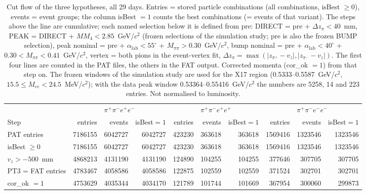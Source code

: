 \begin{table}[H]
\centering\scriptsize
\setlength{\tabcolsep}{3pt}
\caption{Cut flow of the three hypotheses, all 29 days. Entries = stored particle combinations (all combinations, isBest $\geq 0$), events = event groups; the column isBest $=1$ counts the best combinations (= events of that variant). The steps above the line are cumulative; each named selection below it is defined from pre: DIRECT = pre + $\Delta z_\pi<40$~mm, PEAK = DIRECT + $MM_4<2.85$~GeV/$c^2$ (frozen selections of the simulation study; pre is also the frozen BUMP selection), peak nominal = pre + $\alpha_\mathrm{lab}<55^\circ$ + $M_{\pi\pi}>0.30$~GeV/$c^2$, bump nominal = pre + $\alpha_\mathrm{lab}<40^\circ$ + $0.30<M_{\pi\pi}<0.41$~GeV/$c^2$, vertex = both pions in the event-vertex fit, $\Delta z_\pi=\max(|z_{\pi^+}-v_z|,|z_{\pi^-}-v_z|)$. The first four lines are counted in the PAT files, the others in the FAT output. Corrected momenta (cor\_ok $=1$) from that step on. The frozen windows of the simulation study are used for the X17 region (0.5333--0.5587~GeV/$c^2$, $15.5\leq M_{ee}<24.5$~MeV/$c^2$); with the data peak window 0.53364--0.55416~GeV/$c^2$ the numbers are 5258, 14 and 223 entries. Not normalised to luminosity.}
\label{tab:smp_cutflow}
\begin{tabular}{l rrr rrr rrr}
\toprule
 & \multicolumn{3}{c}{$\pi^+\pi^-e^+e^-$} & \multicolumn{3}{c}{$\pi^+\pi^-e^+e^+$} & \multicolumn{3}{c}{$\pi^+\pi^-e^-e^-$} \\
\cmidrule(lr){2-4}\cmidrule(lr){5-7}\cmidrule(lr){8-10}
Step & entries & events & isBest$=1$ & entries & events & isBest$=1$ & entries & events & isBest$=1$ \\
\midrule
PAT entries & 7186155 & 6042727 & 6042727 & 423230 & 363618 & 363618 & 1569416 & 1323546 & 1323546 \\
isBest $\geq 0$ & 7186155 & 6042727 & 6042727 & 423230 & 363618 & 363618 & 1569416 & 1323546 & 1323546 \\
$v_z>-500$~mm & 4868213 & 4131190 & 4131190 & 124890 & 104255 & 104255 & 377646 & 307705 & 307705 \\
PT3 = FAT entries & 4783467 & 4058586 & 4058586 & 122875 & 102559 & 102559 & 371524 & 302701 & 302701 \\
cor\_ok $=1$ & 4753629 & 4035344 & 4034170 & 121789 & 101744 & 101669 & 367954 & 300060 & 299873 \\

\end{tabular}
\end{table}

